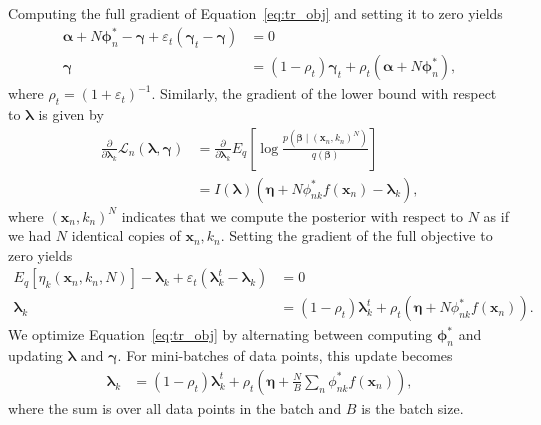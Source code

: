 \documentclass[a4paper]{article}
\begin{document}
		Computing the full gradient of Equation~\ref{eq:tr_obj} and setting it to zero yields
		\begin{align}
			\bm{\alpha} + N \bm{\phi}_{n}^* - \bm{\gamma} + \varepsilon_t (\bm{\gamma}_t - \bm{\gamma}) &= 0 \\
			\bm{\gamma} &= (1 - \rho_t) \bm{\gamma}_t + \rho_t (\bm{\alpha} + N\bm{\phi}_n^*),
		\end{align}
		where $\rho_t = (1 + \varepsilon_t)^{-1}$. Similarly, the gradient of the lower bound with respect to $\bm{\lambda}$ is given by
		\begin{align}
			\frac{\partial}{\partial \bm{\lambda}_k} \mathcal{L}_n(\bm{\lambda}, \bm{\gamma})
			&= \frac{\partial}{\partial \bm{\lambda}_k} E_q\left[ \log \frac{p(\bm{\beta} \mid (\mathbf{x}_n, k_n)^N)}{q(\bm{\beta})} \right] \\
			&= I(\bm{\lambda}) (\bm{\eta} + N\phi^*_{nk} f(\mathbf{x}_n) - \bm{\lambda}_k),
		\end{align}
		where $(\mathbf{x}_n, k_n)^N$ indicates that we compute the posterior with respect to $N$ as if we had $N$ identical copies of $\mathbf{x}_n, k_n$.
		Setting the gradient of the full objective to zero yields
		\begin{align}
			E_q\left[ \eta_k(\mathbf{x}_n, k_n, N) \right] - \bm{\lambda}_k + \varepsilon_t (\bm{\lambda}_k^t - \bm{\lambda}_k) &= 0 \\
			\bm{\lambda}_k &= (1 - \rho_t) \bm{\lambda}_k^t + \rho_t \left( \bm{\eta} + N \phi^*_{nk} f(\mathbf{x}_n) \right).
		\end{align}
		We optimize Equation~\ref{eq:tr_obj} by alternating between computing $\bm{\phi}_n^*$ and updating $\bm{\lambda}$ and $\bm{\gamma}$.
		For mini-batches of data points, this update becomes
		\begin{align}
			\label{eq:tr_update}
			\bm{\lambda}_k &= (1 - \rho_t) \bm{\lambda}_k^t + \rho_t \left( \bm{\eta} + \frac{N}{B} \sum_n \phi^*_{nk} f(\mathbf{x}_n) \right),
		\end{align}
		where the sum is over all data points in the batch and $B$ is the batch size.
\end{document}
